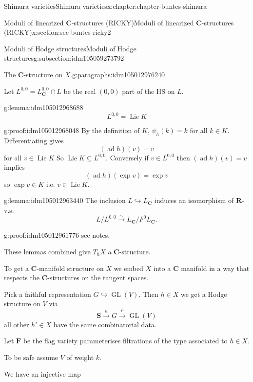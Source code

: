 \documentclass[oneside,10pt,]{book}
\numberwithin{equation}{section}
\DeclareMathOperator{\Lie}{Lie}
\newcommand{\RR}{\mathbf{R}}
\newcommand{\CC}{\mathbf{C}}
\DeclareMathOperator{\ad}{ad}
\DeclareMathOperator{\GL}{GL}
\begin{document}
\begin{chapterptx}{Shimura varieties}{}{Shimura varieties}{}{}{x:chapter:chapter-buntes-shimura}
\begin{sectionptx}{Moduli of linearized \(\CC\)-structures (RICKY)}{}{Moduli of linearized \(\CC\)-structures (RICKY)}{}{}{x:section:sec-buntes-ricky2}
\begin{subsectionptx}{Moduli of Hodge structures}{}{Moduli of Hodge structures}{}{}{g:subsection:idm105059273792}
\begin{paragraphs}{The \(\CC\)-structure on \(X\).}{g:paragraphs:idm105012976240}
\par
Let \(L^{0,0} = L_\CC^{0,0} \cap L\) be the real \((0,0)\) part of the HS on \(L\).%
\begin{lemma}{}{}{g:lemma:idm105012968688}%
%
\begin{equation*}
L^{0,0} = \Lie K
\end{equation*}
%
\end{lemma}
\begin{proofptx}{}{g:proof:idm105012968048}
By the definition of \(K\), \(\psi_h(k) = k\) for all \(k \in K\). Differentiating gives%
\begin{equation*}
(\ad h) (v) = v
\end{equation*}
for all \(v \in \Lie K\) So \(\Lie K  \subseteq L^{0,0}\). Conversely if \(v \in L^{0,0}\) then \((\ad h) (v)=v\) implies%
\begin{equation*}
(\ad h)(\exp v) = \exp v
\end{equation*}
so \(\exp v \in K\) i.e. \(v \in \Lie K\).%
\end{proofptx}
\begin{lemma}{}{}{g:lemma:idm105012963440}%
The inclusion \(L \hookrightarrow L_\CC\) induces an isomorphism of \(\RR\)-v.s.%
\begin{equation*}
L/L^{0,0} \xrightarrow\sim L_\CC / F^0 L_\CC\text{.}
\end{equation*}
%
\end{lemma}
\begin{proofptx}{}{g:proof:idm105012961776}
see notes.%
\end{proofptx}
These lemmas combined give \(T_h X\) a  \(\CC\)-structure.%
\par
To get a \(\CC\)-manifold structure on \(X\) we embed \(X\) into a \(\CC\) manifold in a way that respects the \(\CC\)-structures on the tangent spaces.%
\par
Pick a faithful representation \(G \hookrightarrow \GL(V)\). Then \(h \in X\) we get a Hodge structure on \(V\) via%
\begin{equation*}
\mathbf S \xrightarrow h G \xrightarrow \rho \GL(V)
\end{equation*}
all other \(h' \in X\) have the same combinatorial data.%
\par
Let \(\mathbf F\) be the flag variety parameterises filtrations of the type associated to \(h \in X\).%
\par
To be safe assume \(V\) of weight \(k\).%
\par
We have an injective map%
\begin{equation*}

\end{equation*}
\end{paragraphs}
\end{subsectionptx}
\end{sectionptx}
\end{chapterptx}
\end{document}

